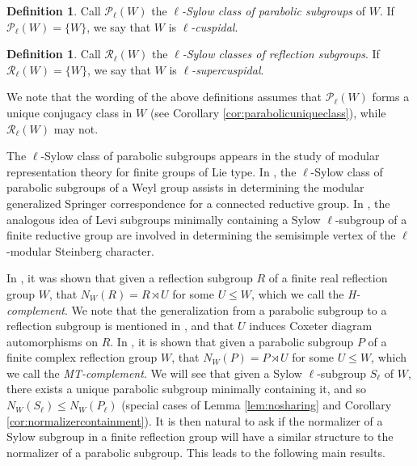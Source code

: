 \documentclass[12pt]{amsart}
\theoremstyle{plain}
\theoremstyle{definition}
\newtheorem{definition}[theorem]{Definition}
\numberwithin{equation}{section}
\numberwithin{equation}{section}
\begin{document}
	\begin{definition}\label{def:sylowclassofparabolics}
		Call $\mathcal{P}_\ell(W)$ the \emph{$\ell$-Sylow class of parabolic subgroups} of $W$. If $\mathcal{P}_\ell(W)=\{W\}$, we say that $W$ is \emph{$\ell$-{cuspidal}}.
	\end{definition}
	
	\begin{definition}\label{def:sylowclassofreflection}
		Call $\mathcal{R}_\ell(W)$ the \emph{$\ell$-Sylow classes of reflection subgroups}. If $\mathcal{R}_\ell(W)=\{W\}$, we say that $W$ is \emph{$\ell$-{supercuspidal}}.
	\end{definition}
	
	We note that the wording of the above definitions assumes that $\mathcal{P}_\ell(W)$ forms a unique conjugacy class in $W$ (see Corollary \ref{cor:parabolicuniqueclass}), while $\mathcal{R}_\ell(W)$ may not.
	
	The $\ell$-Sylow class of parabolic subgroups appears in the study of modular representation theory for finite groups of Lie type. In \cite[Theorem 4.5]{AHJR}, the $\ell$-Sylow class of parabolic subgroups of a Weyl group assists in determining the modular generalized Springer correspondence for a connected reductive group. In \cite[Theorem 4.2]{GHM}, the analogous idea of Levi subgroups minimally containing a Sylow $\ell$-subgroup of a finite reductive group are involved in determining the semisimple vertex of the $\ell$-modular Steinberg character.
	
	In \cite[Lemma 2]{HOWLETT}, it was shown that given a reflection subgroup $R$ of a finite real reflection group $W$, that $N_W(R)=R\rtimes U$ for some $U\leq W$, which we call the \emph{H-complement}. We note that the generalization from a parabolic subgroup to a reflection subgroup is mentioned in \cite[Lemma 3.3]{GHM3}, and that $U$ induces Coxeter diagram automorphisms on $R$. In \cite{MURA}, it is shown that given a parabolic subgroup $P$ of a finite complex reflection group $W$, that $N_W(P)=P\rtimes U$ for some $U\leq W$, which we call the \emph{MT-complement}. We will see that given a Sylow $\ell$-subgroup $S_\ell$ of $W$, there exists a unique parabolic subgroup minimally containing it, and so $N_W(S_\ell)\leq N_W(P_\ell)$ (special cases of Lemma \ref{lem:nosharing} and Corollary \ref{cor:normalizercontainment}). It is then natural to ask if the normalizer of a Sylow subgroup in a finite reflection group will have a similar structure to the normalizer of a parabolic subgroup. This leads to the following main results.
	
\end{document}

